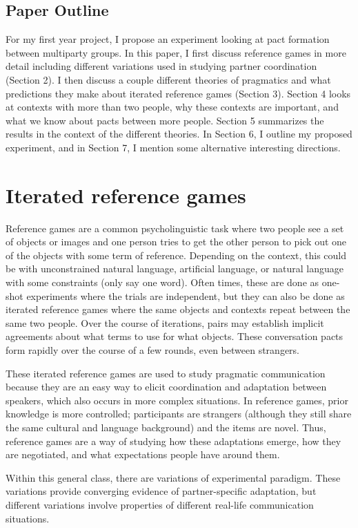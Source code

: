 \documentclass[11pt]{article}
\begin{document}
	\subsection{Paper Outline}
	For my first year project, I propose an experiment looking at pact formation between multiparty groups. In this paper, I first discuss reference games in more detail including different variations used in studying partner coordination (Section 2). I then discuss a couple different theories of pragmatics and what predictions they make about iterated reference games (Section 3). Section 4 looks at contexts with more than two people, why these contexts are important, and what we know about pacts between more people. Section 5 summarizes the results in the context of the different theories. In Section 6, I outline my proposed experiment, and in Section 7, I mention some alternative interesting directions. 
	

	\section{Iterated reference games}
	Reference games are a common psycholinguistic task where two people see a set of objects or images and one person tries to get the other person to pick out one of the objects with some term of reference. Depending on the context, this could be with unconstrained natural language, artificial language, or natural language with some constraints (only say one word). Often times, these are done as one-shot experiments where the trials are independent, but they can also be done as iterated reference games where the same objects and contexts repeat between the same two people. Over the course of iterations, pairs may establish implicit agreements about what terms to use for what objects. These conversation pacts form rapidly over the course of a few rounds, even between strangers. 
	
	These iterated reference games are used to study pragmatic communication because they are an easy way to elicit coordination and adaptation between speakers, which also occurs in more complex situations. In reference games, prior knowledge is more controlled; participants are strangers (although they still share the same cultural and language background) and the items are novel. Thus, reference games are a way of studying how these adaptations emerge, how they are negotiated, and what expectations people have around them. 
	
	Within this general class, there are variations of experimental paradigm. These variations provide converging evidence of partner-specific adaptation, but different variations involve properties of different real-life communication situations. 
	
\end{document}
